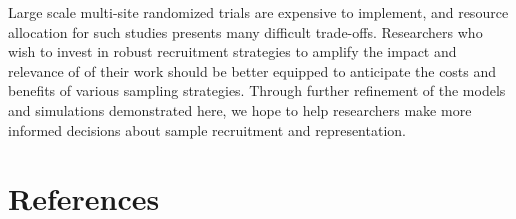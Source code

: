 \documentclass[
  english,
  man,floatsintext]{apa6}
\begin{document}
Large scale multi-site randomized trials are expensive to implement, and resource allocation for such studies presents many difficult trade-offs. Researchers who wish to invest in robust recruitment strategies to amplify the impact and relevance of of their work should be better equipped to anticipate the costs and benefits of various sampling strategies. Through further refinement of the models and simulations demonstrated here, we hope to help researchers make more informed decisions about sample recruitment and representation.

\newpage

\hypertarget{references}{%
\section*{References}\label{references}}

\begingroup
\setlength{\parindent}{-0.5in}
\end{document}
